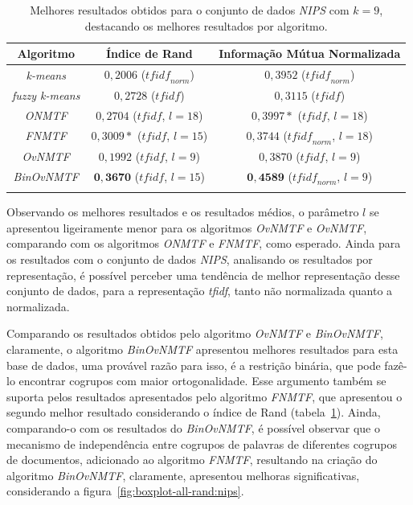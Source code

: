 \documentclass[
    12pt,                %
    oneside,            %
    a4paper,            %
    english,            %
    brazil                %
    ]{abntex2ppgsi}
\begin{document}
\begin{table}[H]
\centering
    \caption{Melhores resultados obtidos para o conjunto de dados \textit{NIPS} com $k = 9$, destacando os melhores resultados por algoritmo.}
    \begin{tabular}{ccc}
        \hline
        Algoritmo              & Índice de Rand & Informação Mútua Normalizada \\
        \hline
        \textit{k-means}       & $0,2006$ ($\textit{tfidf}_{norm}$)           & $0,3952$ ($\textit{tfidf}_{norm}$) \\
        \textit{fuzzy k-means} & $0,2728$ ($\textit{tfidf}$)                  & $0,3115$ ($\textit{tfidf}$) \\
        \textit{ONMTF}         & $0,2704$ ($\textit{tfidf}$, $l=18$)          & $0,3997*$ ($\textit{tfidf}$, $l=18$) \\
        \textit{FNMTF}         & $0,3009*$ ($\textit{tfidf}$, $l=15$)         & $0,3744$ ($\textit{tfidf}_{norm}$, $l=18$) \\
        \textit{OvNMTF}        & $0,1992$ ($\textit{tfidf}$, $l=9$)           & $0,3870$ ($\textit{tfidf}$, $l=9$) \\
        \textit{BinOvNMTF}     & $\mathbf{0,3670}$ ($\textit{tfidf}$, $l=15$) & $\mathbf{0,4589}$ ($\textit{tfidf}_{norm}$, $l=9$) \\
        \hline \\
    \end{tabular}
    \label{tab:experiments-quant-best-nmi:nips}
\end{table}

Observando os melhores resultados e os resultados médios, o parâmetro $l$ se apresentou ligeiramente menor para os algoritmos \textit{OvNMTF} e \textit{OvNMTF}, comparando com os algoritmos \textit{ONMTF} e \textit{FNMTF}, como esperado.
Ainda para os resultados com o conjunto de dados \textit{NIPS}, analisando os resultados por representação, é possível perceber uma tendência de melhor representação desse conjunto de dados, para a representação \textit{tfidf}, tanto não normalizada quanto a normalizada.

Comparando os resultados obtidos pelo algoritmo \textit{OvNMTF} e \textit{BinOvNMTF}, claramente, o algoritmo \textit{BinOvNMTF} apresentou melhores resultados para esta base de dados, uma provável razão para isso, é a restrição binária, que pode fazê-lo encontrar cogrupos com maior ortogonalidade.
Esse argumento também se suporta pelos resultados apresentados pelo algoritmo \textit{FNMTF}, que apresentou o segundo melhor resultado considerando o índice de Rand (tabela~\ref{tab:experiments-quant-best-nmi:nips}).
Ainda, comparando-o com os resultados do \textit{BinOvNMTF}, é possível observar que o mecanismo de independência entre cogrupos de palavras de diferentes cogrupos de documentos, adicionado ao algoritmo \textit{FNMTF}, resultando na criação do algoritmo \textit{BinOvNMTF}, claramente, apresentou melhoras significativas, considerando a figura~\ref{fig:boxplot-all-rand:nips}.
\end{document}
